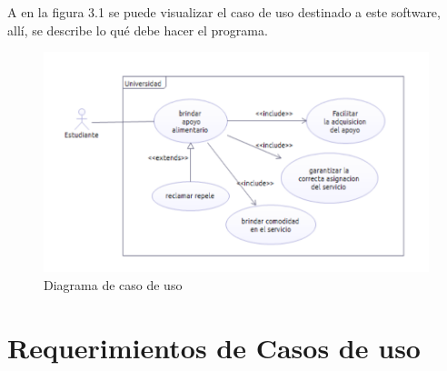 A en la figura 3.1 se puede visualizar el caso de uso destinado a este software, allí, se describe lo qué debe hacer el programa.

\begin{figure}[H]
	\centering
	\includegraphics[width=0.8\linewidth]{parte2/imgs/CasosDeUso/caso1}
	\caption{Diagrama de caso de uso}
	\label{fig:diagramadecasodeuso}
\end{figure}

\section{Requerimientos de Casos de uso}

